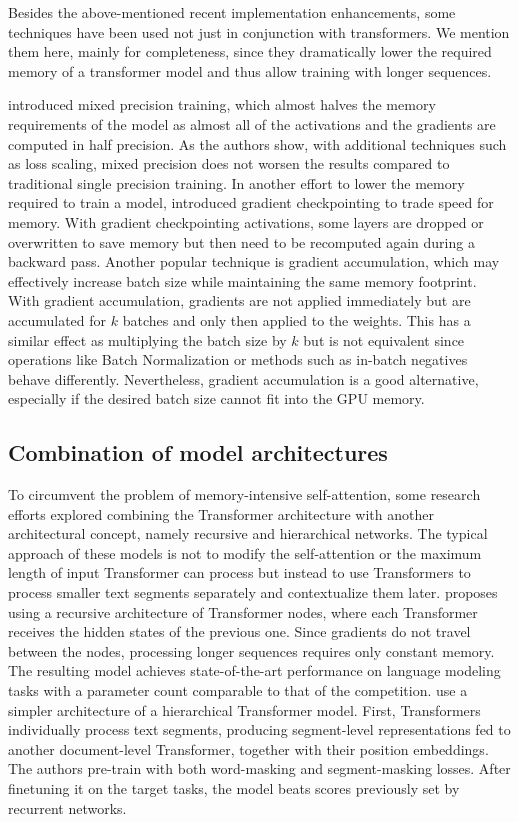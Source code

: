 Besides the above-mentioned recent implementation enhancements, some techniques
have been used not just in conjunction with transformers. We mention them here,
mainly for completeness, since they dramatically lower the required memory of a
transformer model and thus allow training with longer sequences.

\cite{micikevicius2017mixed} introduced mixed precision training, which almost
halves the memory requirements of the model as almost all of the activations
and the gradients are computed in half precision. As the authors show, with
additional techniques such as loss scaling, mixed precision does not worsen the
results compared to traditional single precision training. In another effort to
lower the memory required to train a model, \cite{chen2016training} introduced
gradient checkpointing to trade speed for memory. With gradient checkpointing
activations, some layers are dropped or overwritten to save memory but then
need to be recomputed again during a backward pass. Another popular technique is
gradient accumulation, which may effectively increase batch size while
maintaining the same memory footprint. With gradient accumulation, gradients
are not applied immediately but are accumulated for $k$ batches and only then
applied to the weights. This has a similar effect as multiplying the batch size
by $k$ but is not equivalent since operations like Batch
Normalization \citep{ioffe2015batch} or methods such as in-batch negatives
behave differently. Nevertheless, gradient accumulation is a good alternative,
especially if the desired batch size cannot fit into the GPU memory.

\subsection{Combination of model architectures}

To circumvent the problem of memory-intensive self-attention, some research efforts explored combining the Transformer architecture
with another architectural concept, namely recursive and hierarchical networks.
The typical approach of these models is not to modify the self-attention or the
maximum length of input Transformer can process but instead to use Transformers to process smaller text segments separately and contextualize them
later. \cite{dai2019transformer} proposes using a recursive architecture of
Transformer nodes, where each Transformer receives the hidden states of the
previous one. Since gradients do not travel between the nodes, processing
longer sequences requires only constant memory. The resulting model achieves
state-of-the-art performance on language modeling tasks with a parameter count
comparable to that of the competition. \cite{yang2020beyond} use a simpler
architecture of a hierarchical Transformer model. First, Transformers
individually process text segments, producing segment-level representations fed to another document-level Transformer, together with their
position embeddings. The authors pre-train with both word-masking and
segment-masking losses. After finetuning it on the target tasks, the model
beats scores previously set by recurrent networks.

